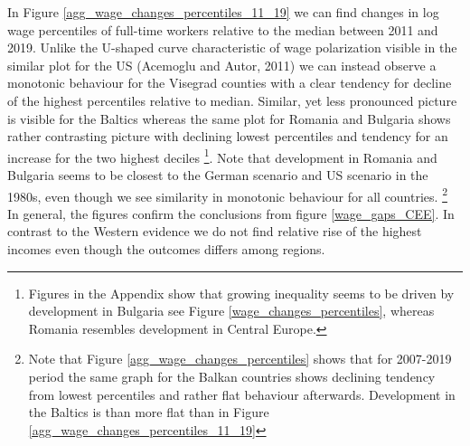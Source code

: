 \documentclass{article}
\begin{document}
In Figure \ref{agg_wage_changes_percentiles_11_19} we can find changes in log wage percentiles of full-time workers relative to the median between 2011 and 2019. Unlike the U-shaped curve characteristic of wage polarization visible in the similar plot for the US (Acemoglu and Autor, 2011) we can instead observe a monotonic behaviour for the Visegrad counties with a clear tendency for decline of the highest percentiles relative to median. Similar, yet less pronounced picture is visible for the Baltics whereas the same plot for Romania and Bulgaria shows rather contrasting picture with declining lowest percentiles and tendency for an increase for the two highest deciles \footnote{Figures in the Appendix show that growing inequality seems to be driven by development in Bulgaria see Figure \ref{wage_changes_percentiles}, whereas Romania resembles development in Central Europe.}. Note that development in Romania and Bulgaria seems to be closest to the German scenario and US scenario in the 1980s, even though we see similarity in monotonic behaviour for all countries. 
\footnote{Note that Figure \ref{agg_wage_changes_percentiles} shows that for 2007-2019 period the same graph for the Balkan countries shows declining tendency from lowest percentiles and rather flat behaviour afterwards. Development in the Baltics is than more flat than in Figure \ref{agg_wage_changes_percentiles_11_19}} In general, the figures confirm the conclusions from figure \ref{wage_gaps_CEE}. In contrast to the Western evidence we do not find relative rise of the highest incomes even though the outcomes differs among regions.\\
\end{document}
